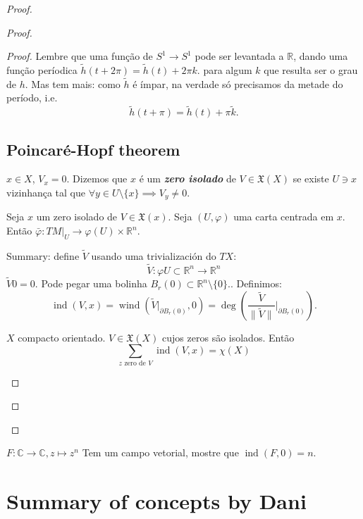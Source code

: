 \begin{proof}
\begin{proof}
\begin{proof}
Lembre que uma função de \(S^1\to S^1\) pode ser levantada a \(\mathbb{R}\), dando uma função períodica \(\tilde{h}(t+2\pi)=\tilde{h}(t)+2\pi k\). para algum \(k\) que resulta ser o grau de \(h\). Mas tem mais: como \(\tilde{h}\) é ímpar, na verdade só precisamos da metade do período, i.e.
\[\tilde{h}(t+\pi)=\tilde{h}(t)+\pi \tilde{k}.\]

\subsection{Poincaré-Hopf theorem}

\begin{defn}\leavevmode
\(x \in X\), \(V_x=0\). Dizemos que \(x\) é um \textit{\textbf{zero isolado}} de \(V\in \mathfrak{X}(X)\) se existe \(U \ni x\) vizinhança tal que \(\forall  y \in U\setminus \{x\} \implies V_y \neq 0\).

Seja \(x\) um zero isolado de \(V \in \mathfrak{X}(x)\). Seja \((U,\varphi)\) uma carta centrada em \(x\). Então \(\bar{\varphi} : TM|_{ U} \to \varphi(U) \times \mathbb{R}^n\).

Summary: define \(\tilde{V}\) usando uma trivialización do \(TX\):
\[\tilde{V}: \varphi U \subset \mathbb{R}^n \to \mathbb{R}^n\]
\(\tilde{V}0=0\). Pode pegar uma bolinha  \(B_{r}(0)\subset \mathbb{R}^n\setminus \{0\}\).. Definimos:
\[\operatorname{ind}(V,x)=\operatorname{wind}(\tilde{V}|_{\partial B_r(0)},0)=\operatorname{deg}\left(\frac{\tilde{V}}{\|\tilde{V}\|}\Big|_{\partial B_r(0)}\right).\]
\end{defn}

\begin{thm}\leavevmode
\(X\) compacto orientado. \(V \in \mathfrak{X}(X)\) cujos zeros são isolados. Então
\[\sum_{z\text{ zero de \(V\)} }\operatorname{ind}(V,x)=\chi(X)\]

\end{thm}


\end{proof}



\end{proof}

\end{proof}

\begin{exercise}\leavevmode
\(F: \mathbb{C} \to \mathbb{C}, z \mapsto z^n\)
Tem um campo vetorial, mostre que \(\operatorname{ind}(F,0)=n\).
\end{exercise}

\section*{Summary of concepts by Dani}

